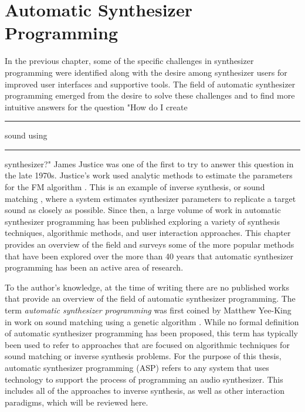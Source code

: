 \chapter{Automatic Synthesizer Programming}
\label{chapter:asp-background}

In the previous chapter, some of the specific challenges in synthesizer programming were identified along with the desire among synthesizer users for improved user interfaces and supportive tools. The field of automatic synthesizer programming emerged from the desire to solve these challenges and to find more intuitive answers for the question "How do I create \rule{1cm}{0.15mm} sound using \rule{1cm}{0.15mm} synthesizer?" James Justice \cite{justice1979analytic} was one of the first to try to answer this question in the late 1970s. Justice's work used analytic methods to estimate the parameters for the FM algorithm \cite{chowning1973synthesis}. This is an example of inverse synthesis, or sound matching \cite{horner1993machine}, where a system estimates synthesizer parameters to replicate a target sound as closely as possible. Since then, a large volume of work in automatic synthesizer programming has been published exploring a variety of synthesis techniques, algorithmic methods, and user interaction approaches. This chapter provides an overview of the field and surveys some of the more popular methods that have been explored over the more than 40 years that automatic synthesizer programming has been an active area of research.

To the author's knowledge, at the time of writing there are no published works that provide an overview of the field of automatic synthesizer programming. The term \textit{automatic synthesizer programming} was first coined by Matthew Yee-King in work on sound matching using a genetic algorithm \cite{yee2008synthbot}. While no formal definition of automatic synthesizer programming has been proposed, this term has typically been used to refer to approaches that are focused on algorithmic techniques for sound matching or inverse synthesis problems. For the purpose of this thesis, automatic synthesizer programming (ASP) refers to any system that uses technology to support the process of programming an audio synthesizer. This includes all of the approaches to inverse synthesis, as well as other interaction paradigms, which will be reviewed here.

